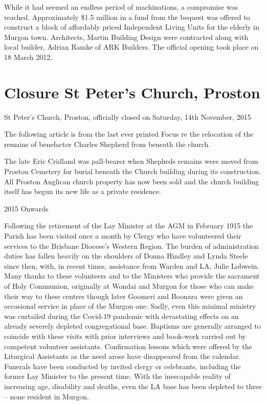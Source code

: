 While it had seemed an endless period of machinations, a compromise was reached. Approximately \$1.5 million in a fund from the bequest was offered to construct a block of affordably priced Independent Living Units for the elderly in Murgon town. Architects, Martin Building Design were contracted along with local builder, Adrian Ramke of ARK Builders. The official opening took place on 18 March 2012.

\hypertarget{closure-st-peters-church-proston}{%
\section{Closure St Peter's Church, Proston}\label{closure-st-peters-church-proston}}

St Peter's Church, Proston, officially closed on Saturday, 14th November, 2015

The following article is from the last ever printed Focus re the relocation of the remains of benefactor Charles Shepherd from beneath the church.

The late Eric Cridland was pall-bearer when Shepheds remains were moved from Proston Cemetery for burial beneath the Church building during its construction. All Proston Anglican church property has now been sold and the church building itself has begun its new life as a private residence.

2015 Onwards

Following the retirement of the Lay Minister at the AGM in February 1915 the Parish has been visited once a month by Clergy who have volunteered their services to the Brisbane Diocese's Western Region. The burden of administration duties has fallen heavily on the shoulders of Donna Hindley and Lynda Steele since then, with, in recent times, assistance from Warden and LA, Julie Lobwein. Many thanks to these volunteers and to the Ministers who provide the sacrament of Holy Communion, originally at Wondai and Murgon for those who can make their way to these centres though later Goomeri and Boonara were given an occasional service in place of the Murgon one. Sadly, even this minimal ministry was curtailed during the Covid-19 pandemic with devastating effects on an already severely depleted congregational base. Baptisms are generally arranged to coincide with these visits with prior interviews and book-work carried out by competent volunteer assistants. Confirmation lessons which were offered by the Liturgical Assistants as the need arose have disappeared from the calendar. Funerals have been conducted by invited clergy or celebrants, including the former Lay Minister to the present time. With the inescapable reality of increasing age, disability and deaths, even the LA base has been depleted to three -- none resident in Murgon.

